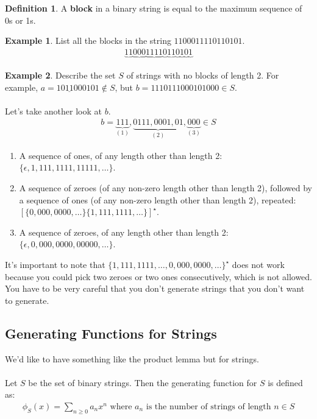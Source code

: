 \documentclass[]{article}
\theoremstyle{definition}
\newtheorem*{defn}{Definition}
\newtheorem{ex}{Example}[section]
\begin{document}
		\begin{defn}
			A \textbf{block} in a binary string is equal to the maximum sequence of 0s or 1s.
		\end{defn}
		
		\begin{ex}
			List all the blocks in the string $1100011110110101$.
			\begin{align*}
				\underbrace{11} \underbrace{000} \underbrace{1111} \underbrace{0} \underbrace{11} \underbrace{0} \underbrace{1} \underbrace{0} \underbrace{1}
			\end{align*}
		\end{ex}

		\begin{ex}
			Describe the set $S$ of strings with no blocks of length 2. For example, $a = 10\underline{11}000101 \not \in S$, but $b = 1110111000101000 \in S$.
			\\ \\
			Let's take another look at $b$.
			\begin{align*}
				b = \underbrace{111}_{(1)},\underbrace{0111,0001,01}_{(2)},\underbrace{000}_{(3)} \in S
			\end{align*}

			\begin{enumerate}
				\item A sequence of ones, of any length other than length 2: $\{ \epsilon, 1, 111, 1111, 11111, \ldots \}$.
				\item A sequence of zeroes (of any non-zero length other than length 2), followed by a sequence of ones (of any non-zero length other than length 2), repeated: $[ \{0, 000, 0000, \ldots \} \{1, 111, 1111, \ldots \} ]^\star$.
				\item A sequence of zeroes, of any length other than length 2: $\{ \epsilon, 0, 000, 0000, 00000, \ldots \}$.
			\end{enumerate}

			It's important to note that $\{ 1, 111, 1111, \ldots, 0, 000, 0000, \ldots \}^\star$ does not work because you could pick two zeroes or two ones consecutively, which is not allowed. You have to be very careful that you don't generate strings that you don't want to generate.
		\end{ex}

		\subsection{Generating Functions for Strings}
			We'd like to have something like the product lemma but for strings.
			\\ \\
			Let $S$ be the set of binary strings. Then the generating function for $S$ is defined as:
			\begin{align*}
				\phi_S(x) = \sum_{n \ge 0} a_n x^n \text{ where } a_n \text{ is the number of strings of length } n \in S
			\end{align*}
\end{document}
